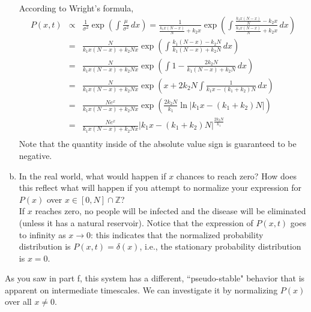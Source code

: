 \documentclass{article}
\begin{document}
\begin{enumerate}[a)]
{\color{red}
According to Wright's formula,
\begin{eqnarray*}
P(x,t) & \propto &  \frac{1}{\sigma^2} \exp \left( \int \frac{\mu}{\sigma^2} \, dx  \right) = \frac{1}{ \frac{k_1 x(N-x)}{N} + k_2 x} \exp \left( \int \frac{ \frac{k_1 x(N-x)}{N} - k_2 x}{ \frac{k_1 x(N-x)}{N} + k_2 x} \, dx  \right)\\
& = & \frac{N}{ k_1 x(N-x) + k_2 N x}    \exp \left( \int \frac{ k_1 (N-x) - k_2 N}{ k_1 (N-x) + k_2 N} \, dx  \right)\\
& = & \frac{N}{ k_1 x(N-x) + k_2 N x}    \exp \left( \int 1 - \frac{ 2 k_2 N}{ k_1 (N-x) + k_2 N} \, dx  \right)\\
& = & \frac{N}{ k_1 x(N-x) + k_2 N x}    \exp \left( x + 2 k_2 N \int  \frac{ 1}{ k_1 x - (k_1 + k_2) N} \, dx  \right)\\
& = & \frac{Ne^x}{ k_1 x(N-x) + k_2 N x}    \exp \left( \frac{ 2 k_2 N}{k_1} \ln \left| k_1 x - (k_1 + k_2) N \right|   \right)\\
& = & \frac{Ne^x}{ k_1 x(N-x) + k_2 N x} \left| k_1 x - (k_1 + k_2) N \right|^{ \frac{ 2 k_2 N}{k_1} }\\
 \end{eqnarray*}
Note that the quantity inside of the absolute value sign is guaranteed to be negative.
}

\item In the real world, what would happen if $x$ chances to reach zero? How does this reflect what will happen if you attempt to normalize your expression for $P(x)$ over $x \in [0, N] \cap \mathbb{Z}$?\\
{\color{red}
If $x$ reaches zero, no people will be infected and the disease will be eliminated (unless it has a natural reservoir). Notice that the expression of $P(x,t)$ goes to infinity as $x \to 0$: this indicates that the normalized probability distribution is $P(x,t)=\delta(x)$, i.e., the stationary probability distribution is $x=0$.
}
\end{enumerate}
As you saw in part f, this system has a different, ``pseudo-stable" behavior that is apparent on intermediate timescales. We can investigate it by normalizing $P(x)$ over all $x \neq 0$.
\end{document}
